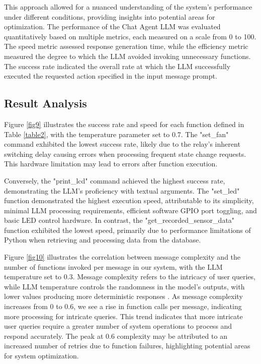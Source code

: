 \documentclass[lettersize,journal]{IEEEtran}
\begin{document}
This approach allowed for a nuanced understanding of the system's performance under different conditions, providing insights into potential areas for optimization. The performance of the Chat Agent LLM was evaluated quantitatively based on multiple metrics, each measured on a scale from 0 to 100. The speed metric assessed response generation time, while the efficiency metric measured the degree to which the LLM avoided invoking unnecessary functions. The success rate indicated the overall rate at which the LLM successfully executed the requested action specified in the input message prompt.

\subsection{Result Analysis}
Figure \ref{fig9} illustrates the success rate and speed for each function defined in Table \ref{table2}, with the temperature parameter set to 0.7. The "set\_fan" command exhibited the lowest success rate, likely due to the relay's inherent switching delay causing errors when processing frequent state change requests. This hardware limitation may lead to errors after function execution.  


Conversely, the "print\_lcd" command achieved the highest success rate, demonstrating the LLM's proficiency with textual arguments. The "set\_led" function demonstrated the highest execution speed, attributable to its simplicity, minimal LLM processing requirements, efficient software GPIO port toggling, and basic LED control hardware. In contrast, the "get\_recorded\_sensor\_data" function exhibited the lowest speed, primarily due to performance limitations of Python when retrieving and processing data from the database.


Figure \ref{fig10} illustrates the correlation between message complexity and the number of functions invoked per message in our system, with the LLM temperature set to 0.3. Message complexity refers to the intricacy of user queries, while LLM temperature controls the randomness in the model's outputs, with lower values producing more deterministic responses \cite{rum2024setting}. As message complexity increases from 0 to 0.6, we see a rise in function calls per message, indicating more processing for intricate queries. This trend indicates that more intricate user queries require a greater number of system operations to process and respond accurately. The peak at 0.6 complexity may be attributed to an increased number of retries due to function failures, highlighting potential areas for system optimization. 
\end{document}
